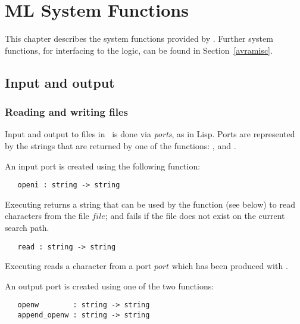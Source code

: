 \chapter{ML System Functions}
\label{sysfuns}

This chapter describes the system functions provided by \ML.
Further system functions, for interfacing to the logic, can be
found in Section~\ref{avramisc}.

\section{Input and output}

\subsection{Reading and writing files}

Input and output to files in \ML\ is done via
{\it ports\/},
as in Lisp.  Ports are represented by the
strings
that are returned by one of the functions: ,  and
.

An input port is created using the following function:

\begin{boxed}
\begin{verbatim}
   openi : string -> string
\end{verbatim}\end{boxed}

\noindent Executing  returns a string that can be used by
the function  (see below) to read characters from the file $file$; and
fails if the file does not exist on the current search path.

\begin{boxed}
\begin{verbatim}
   read : string -> string
\end{verbatim}\end{boxed}

\noindent Executing  reads a character from a port $port$
which has been produced with .

An output port is created using one of the two functions:

\begin{boxed}
\begin{verbatim}
   openw        : string -> string
   append_openw : string -> string
\end{verbatim}\end{boxed}


